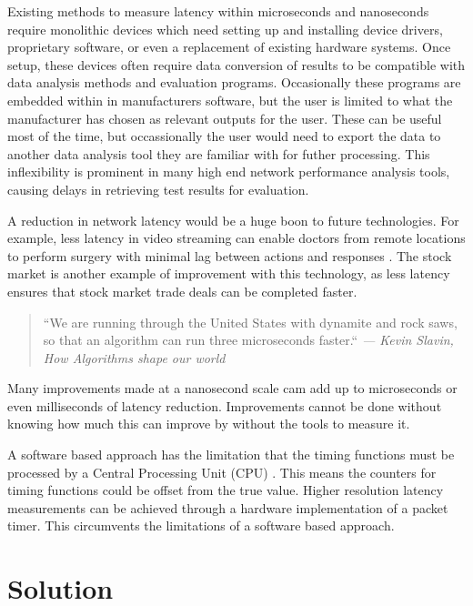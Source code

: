 \par Existing methods to measure latency within microseconds and nanoseconds require monolithic devices which need setting up and installing device drivers, proprietary software, or even a replacement of existing hardware systems.
Once setup, these devices often require data conversion of results to be compatible with data analysis methods and evaluation programs. 
Occasionally these programs are embedded within in manufacturers software, but the user is limited to what the manufacturer has chosen as relevant outputs for the user.
These can be useful most of the time, but occassionally the user would need to export the data to another data analysis tool they are familiar with for futher processing.
This inflexibility is prominent in many high end network performance analysis tools, causing delays in retrieving test results for evaluation.

\par A reduction in network latency would be a huge boon to future technologies. For example, less
latency in video streaming can enable doctors from remote locations to perform surgery with
minimal lag between actions and responses \cite{remotesurgery}. The stock market is another example of improvement with
this technology, as less latency ensures that stock market trade deals can be completed faster.

\begin{quote}
    \centering
    ``We are running through the United States with dynamite and rock saws, so that an algorithm can
    run three microseconds faster.`` \em --- Kevin Slavin, How Algorithms shape our world \cite{tedTalkAlgorithms}
\end{quote} 

\par Many improvements made at a nanosecond scale cam add up to microseconds or even milliseconds of latency
reduction. Improvements cannot be done without knowing how much this can improve by without the tools to measure it.

\par A software based approach has the limitation that the timing functions must be processed by a
Central Processing Unit (CPU) \cite{CPUtiming}. This means the counters for timing functions could be offset from the true value. Higher
resolution latency measurements can be achieved through a hardware implementation of a packet
timer. This circumvents the limitations of a software based approach.

\section{Solution}

